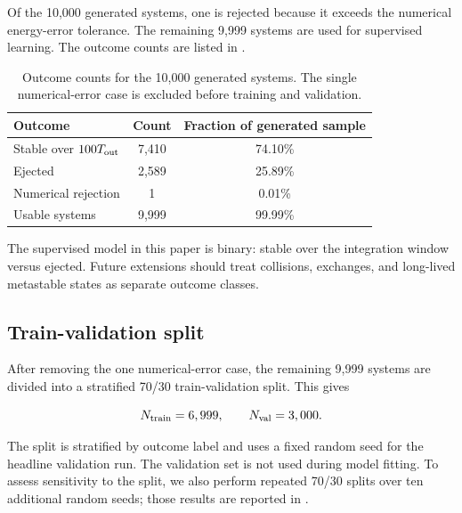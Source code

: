 \documentclass[12pt,a4paper]{article}
\newcommand{\Tout}{T_{\rm out}}
\begin{document}
Of the 10,000 generated systems, one is rejected because it exceeds the numerical energy-error tolerance. The remaining 9,999 systems are used for supervised learning. The outcome counts are listed in .

\begin{table}[H]
\centering
\caption{Outcome counts for the 10,000 generated systems. The single numerical-error case is excluded before training and validation.}
\label{tab:outcome_counts}
\begin{tabular}{lcc}
\toprule
Outcome & Count & Fraction of generated sample \\
\midrule
Stable over \(100\Tout\) & 7,410 & 74.10\% \\
Ejected & 2,589 & 25.89\% \\
Numerical rejection & 1 & 0.01\% \\
\midrule
Usable systems & 9,999 & 99.99\% \\
\bottomrule
\end{tabular}
\end{table}

The supervised model in this paper is binary: stable over the integration window versus ejected. Future extensions should treat collisions, exchanges, and long-lived metastable states as separate outcome classes.

\subsection{Train-validation split}
\label{sec:train_val_split}

After removing the one numerical-error case, the remaining 9,999 systems are divided into a stratified 70/30 train-validation split. This gives

\begin{equation}
    N_{\rm train}=6,999,
    \qquad
    N_{\rm val}=3,000.
\end{equation}

The split is stratified by outcome label and uses a fixed random seed for the headline validation run. The validation set is not used during model fitting. To assess sensitivity to the split, we also perform repeated 70/30 splits over ten additional random seeds; those results are reported in .

\end{document}
